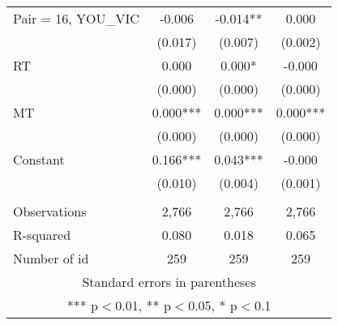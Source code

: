 \documentclass[]{article}
\begin{document}
\begin{tabular}{lccc}
Pair = 16, YOU\_VIC & -0.006 & -0.014** & 0.000 \\
 & (0.017) & (0.007) & (0.002) \\
RT & 0.000 & 0.000* & -0.000 \\
 & (0.000) & (0.000) & (0.000) \\
MT & 0.000*** & 0.000*** & 0.000*** \\
 & (0.000) & (0.000) & (0.000) \\
Constant & 0.166*** & 0.043*** & -0.000 \\
 & (0.010) & (0.004) & (0.001) \\
 &  &  &  \\
Observations & 2,766 & 2,766 & 2,766 \\
R-squared & 0.080 & 0.018 & 0.065 \\
 Number of id & 259 & 259 & 259 \\ \hline
\multicolumn{4}{c}{ Standard errors in parentheses} \\
\multicolumn{4}{c}{ *** p$<$0.01, ** p$<$0.05, * p$<$0.1} \\
\end{tabular}
\end{document}
